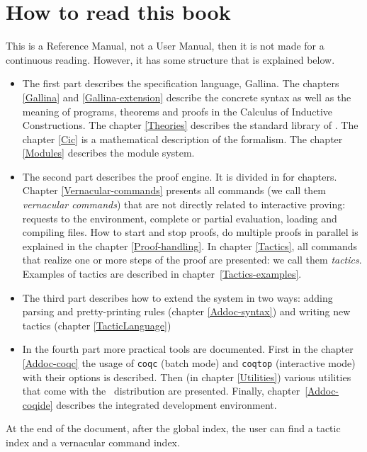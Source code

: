\section*{How to read this book}

This is a Reference Manual, not a User Manual, then it is not made for a
continuous reading. However, it has some structure that is explained
below.

\begin{itemize}
\item The first part describes the specification language,
  Gallina. The chapters \ref{Gallina} and \ref{Gallina-extension}
  describe the concrete syntax as well as the meaning of programs,
  theorems and proofs in the Calculus of Inductive Constructions. The
  chapter \ref{Theories} describes the standard library of \Coq. The
  chapter \ref{Cic} is a mathematical description of the
  formalism. The chapter \ref{Modules} describes the module system.

\item The second part describes the proof engine. It is divided in
  for chapters. Chapter \ref{Vernacular-commands} presents
  all commands (we call them \textit{vernacular commands}) that are not
  directly related to interactive proving: requests to the environment,
  complete or partial evaluation, loading and compiling files. How to
  start and stop proofs, do multiple proofs in parallel is explained
  in the chapter \ref{Proof-handling}. In chapter \ref{Tactics}, 
  all commands that realize one or more steps of the proof are
  presented: we call them  \textit{tactics}. Examples of tactics are
  described in chapter~\ref{Tactics-examples}.

\item The third part describes how to extend the system in two ways:
  adding parsing and pretty-printing rules (chapter
  \ref{Addoc-syntax}) and writing new tactics (chapter
  \ref{TacticLanguage})


\item In the fourth part more practical tools are documented. First in
  the chapter \ref{Addoc-coqc} the usage of \texttt{coqc} (batch mode)
  and \texttt{coqtop} (interactive mode) with their options is
  described. Then (in chapter \ref{Utilities}) 
  various utilities that come with the \Coq\ distribution are
  presented.
  Finally, chapter~\ref{Addoc-coqide} describes the \Coq{} integrated
  development environment. 
\end{itemize}

At the end of the document, after the global index, the user can find
a tactic index and a vernacular command index.

